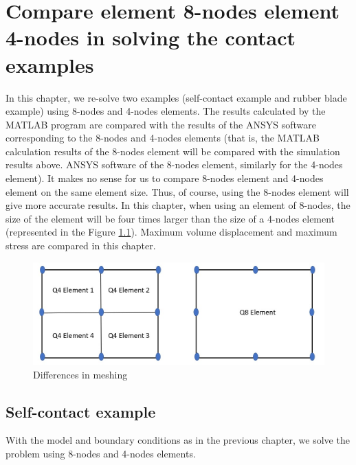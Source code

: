 \chapter{Compare element 8-nodes element 4-nodes in solving the contact examples} %

\label{Chapter5 } %
In this chapter, we re-solve two examples (self-contact example and rubber blade example) using 8-nodes and 4-nodes elements. The results calculated by the MATLAB program are compared with the results of the ANSYS software corresponding to the 8-nodes and 4-nodes elements (that is, the MATLAB calculation results of the 8-nodes element will be compared with the simulation results above. ANSYS software of the 8-nodes element, similarly for the 4-nodes element).
\vspace{0.38cm}
\newline
It makes no sense for us to compare 8-nodes element and 4-nodes element on the same element size. Thus, of course, using the 8-nodes element will give more accurate results. In this chapter, when using an element of 8-nodes, the size of the element will be four times larger than the size of a 4-nodes element (represented in the Figure \ref{fig:dif4-nodes8-nodes}).
\vspace{0.38cm}
\newline
Maximum volume displacement and maximum stress are compared in this chapter.
\newline
\begin{figure}[H]
    \centering
    \includegraphics[scale=0.5]{Figures/chapter5/difQ4Q8.jpg}
    \decoRule
    \caption{Differences in meshing}
    \label{fig:dif4-nodes8-nodes}
\end{figure}
\newpage
\section{Self-contact example}
With the model and boundary conditions as in the previous chapter, we solve the problem using 8-nodes and 4-nodes elements.

